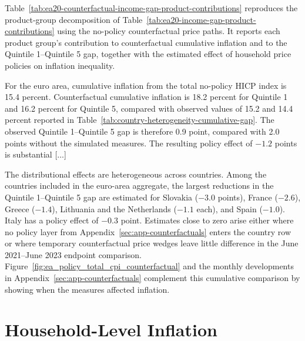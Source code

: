 \documentclass[11pt]{article}
\begin{document}


Table~\ref{tab:ea20-counterfactual-income-gap-product-contributions} reproduces the product-group
decomposition of Table~\ref{tab:ea20-income-gap-product-contributions} using the no-policy
counterfactual price paths. It reports each product group's contribution to counterfactual cumulative
inflation and to the Quintile 1--Quintile 5 gap, together with the estimated effect of household price policies
on inflation inequality.



For the euro area, cumulative inflation from the total no-policy HICP index is 15.4 percent.
Counterfactual cumulative inflation is 18.2 percent for Quintile 1 and 16.2 percent for Quintile 5,
compared with observed values of 15.2 and 14.4 percent reported in Table~\ref{tab:country-heterogeneity-cumulative-gap}.
The observed Quintile 1--Quintile 5 gap is therefore 0.9 point,
compared with 2.0 points without the simulated measures.
The resulting policy effect of $-1.2$ points is substantial [...]

The distributional effects are heterogeneous across countries. Among the countries included in the
euro-area aggregate, the largest reductions in the Quintile 1--Quintile 5 gap are estimated for
Slovakia ($-3.0$ points), France ($-2.6$), Greece ($-1.4$), Lithuania and the Netherlands ($-1.1$ each),
and Spain ($-1.0$). Italy has a policy
effect of $-0.3$ point. Estimates close to zero arise either where no policy
layer from Appendix~\ref{sec:app-counterfactuals} enters the country row or where temporary
counterfactual price wedges leave little difference in the June 2021--June 2023 endpoint comparison.
Figure~\ref{fig:ea_policy_total_cpi_counterfactual} and the monthly developments in
Appendix~\ref{sec:app-counterfactuals} complement this cumulative comparison by showing when the
measures affected inflation.


\section{Household-Level Inflation}
\label{sec:household-level}
\end{document}

